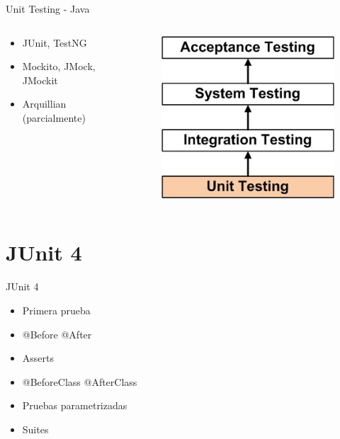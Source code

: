 \documentclass{beamer}
\begin{document}
\begin{frame}{Unit Testing - Java}
\begin{columns}[T]
	\begin{column}[T]{6cm}
		\begin{itemize}
			\item JUnit, TestNG
			\item Mockito, JMock, JMockit
			\item Arquillian (parcialmente)
		\end{itemize}
	\end{column}
	\begin{column}[T]{4cm} %
		\begin{figure}
			\centering
			\includegraphics[width=0.8\linewidth]{Images/unittesting}
		\end{figure}
	\end{column}
\end{columns}
\end{frame}


\section{JUnit 4}

\begin{frame}{JUnit 4}
	\begin{itemize}
		\item Primera prueba
		\item @Before @After
		\item Asserts
		\item @BeforeClass @AfterClass
		\item Pruebas parametrizadas
		\item Suites
	\end{itemize}
\end{frame}
\end{document}

